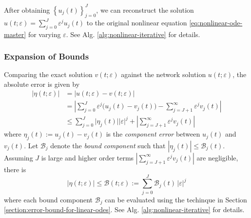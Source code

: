 \documentclass[accepted]{uai2023}
\newcommand{\Err}{\eta}
\newcommand{\Bound}{\mathcal{B}}
\begin{document}
    After obtaining $\left\{u_j(t)\right\}_{j=0}^{J}$, we can reconstruct the solution $u(t;\varepsilon) = \sum_{j=0}^{J} \varepsilon^j u_j(t)$ to the original nonlinear equation \ref{eq:nonlinear-ode-master} for varying $\varepsilon$.
    See Alg. \ref{alg:nonlinear-iterative} for details.

\subsubsection{Expansion of Bounds}
    Comparing the exact solution $v(t; \varepsilon)$ against the network solution $u(t; \varepsilon)$, the absolute error is given by 
    {
        \small
        \begin{align}
            |\Err(t; \varepsilon)| &= \big|u(t; \varepsilon) - v(t; \varepsilon)\big| \nonumber \\[-0.25em]
            &= \left|\sum_{j=0}^{J} \varepsilon^{j} \Big(u_j(t) - v_j(t)\Big) - \sum_{j=J+1}^{\infty} \varepsilon^j v_j(t)\right| \nonumber \\[-0.5em]
            &\leq \sum_{j=0}^{J} \Big|\Err_{j}(t)\Big||\varepsilon|^j + \left|\sum_{j=J+1}^{\infty}\varepsilon^j v_j(t)\right| 
        \end{align}
    }
    where $\Err_{j}(t) := u_j(t) - v_j(t)$ is the \textit{component error} between $u_j(t)$ and $v_j(t)$.
    Let $\Bound_{j}$ denote the \textit{bound component} such that $|\Err_{j}(t)| \leq \Bound_j(t)$.
    Assuming $J$ is large and higher order terms $\left|\sum_{j=J+1}^{\infty}\varepsilon^j v_j(t)\right|$ are negligible, there is 
    {
        \small
        \begin{equation} \label{eq:nonlinear-bound-components}
            \Big|\Err(t; \varepsilon)\Big| \leq \Bound(t; \varepsilon) := \sum_{j=0}^{J} \Bound_j(t)\,|\varepsilon|^j 
        \end{equation}
    }
    where each bound component $\Bound_j$ can be evaluated using the techinque in Section \ref{section:error-bound-for-linear-odes}. 
    See Alg. \ref{alg:nonlinear-iterative} for details.
\end{document}
